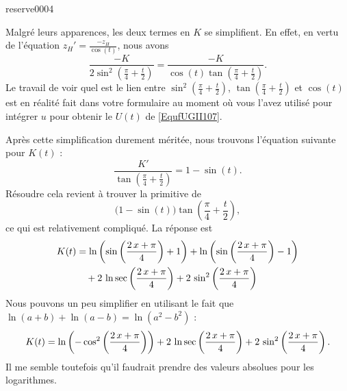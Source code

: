 \begin{corrige}{reserve0004}
\begin{enumerate}
		      Malgré leurs apparences, les deux termes en $K$ se simplifient. En effet, en vertu de l'équation $z_H'=\frac{ -z_H }{ \cos(t) }$, nous avons
		      \begin{equation}
			      \frac{ -K }{ 2\sin^2\left( \frac{ \pi }{ 4 }+\frac{ t }{ 2 } \right)}=\frac{ -K }{ \cos(t)\tan\left( \frac{ \pi }{ 4 }+\frac{ t }{ 2 } \right) }.
		      \end{equation}
		      Le travail de voir quel est le lien entre $\sin^2\left( \frac{ \pi }{ 4 }+\frac{ t }{ 2 } \right)$, $\tan\left( \frac{ \pi }{ 4 }+\frac{ t }{ 2 } \right)$ et $\cos(t)$ est en réalité fait dans votre formulaire au moment où vous l'avez utilisé pour intégrer $u$ pour obtenir le $U(t)$ de \eqref{EqufUGII107}.

		      Après cette simplification durement méritée, nous trouvons l'équation suivante pour $K(t)$ :
		      \begin{equation}		\label{EqFracII107exoVVprb}
			      \frac{ K' }{ \tan\left( \frac{ \pi }{ 4 }+\frac{ t }{ 2 } \right) }=1-\sin(t).
		      \end{equation}
		      Résoudre cela revient à trouver la primitive de
		      \begin{equation}
			      \big( 1-\sin(t) \big) \tan\left( \frac{ \pi }{ 4 }+\frac{ t }{ 2 } \right),
		      \end{equation}
		      ce qui est relativement compliqué. La réponse est
		      \begin{equation}
			      \begin{aligned}[]
				      K(t) & =\ln \left(\sin \left({{2\,x+\pi}\over{4}}\right)+1\right)+\ln  \left(\sin \left({{2\,x+\pi}\over{4}}\right)-1\right) \\
				           & \quad+2\,\ln \sec  \left({{2\,x+\pi}\over{4}}\right)+2\,\sin ^2\left({{2\,x+\pi}\over{4 }}\right)
			      \end{aligned}
		      \end{equation}
		      Nous pouvons un peu simplifier en utilisant le fait que $\ln(a+b)+\ln(a-b)=\ln(a^2-b^2)$ :
		      \begin{equation}
			      \begin{aligned}[]
				      K(t)	=\ln\left(-\cos^2 \left({{2\,x+\pi}\over{4}}\right)\right)
				      +2\,\ln \sec  \left({{2\,x+\pi}\over{4}}\right)+2\,\sin ^2\left({{2\,x+\pi}\over{4 }}\right).
			      \end{aligned}
		      \end{equation}
		      Il me semble toutefois qu'il faudrait prendre des valeurs absolues pour les logarithmes.

	\end{enumerate}

\end{corrige}
